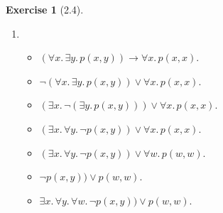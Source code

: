 \documentclass[12pt, psamsfonts]{amsart}
\theoremstyle{definition}
\newtheorem*{exer}{Exercise}
\theoremstyle{remark}
\numberwithin{equation}{subsection}
\begin{document}
\begin{exer}[2.4]
    $ $
    \begin{enumerate}[label=(\alph*)]
        \item
            \begin{itemize}
                \item
                    $(\forall x.\, \exists y.\, p(x, y)) \rightarrow \forall x.\, p(x, x)$.
                \item
                    $\neg (\forall x.\, \exists y.\, p(x, y)) \lor \forall x.\, p(x, x)$.
                \item
                    $(\exists x.\, \neg(\exists y.\, p(x, y))) \lor \forall x.\, p(x, x)$.
                \item
                    $(\exists x.\, \forall y.\, \neg p(x, y)) \lor \forall x.\, p(x, x)$.
                \item
                    $(\exists x.\, \forall y.\, \neg p(x, y)) \lor \forall w.\, p(w, w)$.
                \item
                    $\neg p(x, y)) \lor p(w, w)$.
                \item
                    $\exists x.\, \forall y.\, \forall w.\, \neg p(x, y)) \lor p(w, w)$.
            \end{itemize}
    \end{enumerate}
\end{exer}
\end{document}
